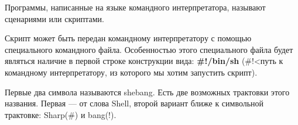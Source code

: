 Программы, написанные на языке командного интерпретатора, называют сценариями или скриптами. 

Скрипт может быть передан командному интерпретатору с помощью специального командного файла. Особенностью этого специального файла будет являться наличие в первой строке конструкции вида:
\textbf{\#!/bin/sh} (\#!<путь к командному интерпретатору, из которого мы хотим запустить скрипт).

Первые два символа называются shebang. Есть две возможных трактовки этого названия. Первая --- от слова Shell, второй вариант ближе к символьной трактовке: Sharp(\#) и bang(!).